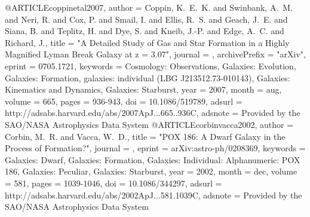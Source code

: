 {{{{{{{{{{{{{{@ARTICLE{coppinetal2007,
   author = {{Coppin}, K.~E.~K. and {Swinbank}, A.~M. and {Neri}, R. and 
	{Cox}, P. and {Smail}, I. and {Ellis}, R.~S. and {Geach}, J.~E. and 
	{Siana}, B. and {Teplitz}, H. and {Dye}, S. and {Kneib}, J.-P. and 
	{Edge}, A.~C. and {Richard}, J.},
    title = "{A Detailed Study of Gas and Star Formation in a Highly Magnified Lyman Break Galaxy at z = 3.07}",
  journal = {\apj},
archivePrefix = "arXiv",
   eprint = {0705.1721},
 keywords = {Cosmology: Observations, Galaxies: Evolution, Galaxies: Formation, galaxies: individual (LBG J213512.73-010143), Galaxies: Kinematics and Dynamics, Galaxies: Starburst},
     year = 2007,
    month = aug,
   volume = 665,
    pages = {936-943},
      doi = {10.1086/519789},
   adsurl = {http://adsabs.harvard.edu/abs/2007ApJ...665..936C},
  adsnote = {Provided by the SAO/NASA Astrophysics Data System}
}
@ARTICLE{corbinvacca2002,
   author = {{Corbin}, M.~R. and {Vacca}, W.~D.},
    title = "{POX 186: A Dwarf Galaxy in the Process of Formation?}",
  journal = {\apj},
   eprint = {arXiv:astro-ph/0208369},
 keywords = {Galaxies: Dwarf, Galaxies: Formation, Galaxies: Individual: Alphanumeric: POX 186, Galaxies: Peculiar, Galaxies: Starburst},
     year = 2002,
    month = dec,
   volume = 581,
    pages = {1039-1046},
      doi = {10.1086/344297},
   adsurl = {http://adsabs.harvard.edu/abs/2002ApJ...581.1039C},
  adsnote = {Provided by the SAO/NASA Astrophysics Data System}
}


}}}}}}}}}}}}}}
